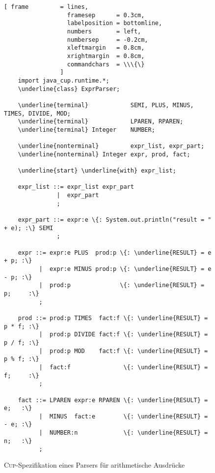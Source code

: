 \begin{figure}[!ht]
\centering
\begin{Verbatim}[ frame         = lines, 
                  framesep      = 0.3cm, 
                  labelposition = bottomline,
                  numbers       = left,
                  numbersep     = -0.2cm,
                  xleftmargin   = 0.8cm,
                  xrightmargin  = 0.8cm,
                  commandchars  = \\\{\}
                ]
    import java_cup.runtime.*;
    \underline{class} ExprParser;
    
    \underline{terminal}            SEMI, PLUS, MINUS, TIMES, DIVIDE, MOD;
    \underline{terminal}            LPAREN, RPAREN;
    \underline{terminal} Integer    NUMBER;
    
    \underline{nonterminal}         expr_list, expr_part;
    \underline{nonterminal} Integer expr, prod, fact;
    
    \underline{start} \underline{with} expr_list;

    expr_list ::= expr_list expr_part 
               |  expr_part
               ;
    
    expr_part ::= expr:e \{: System.out.println("result = " + e); :\} SEMI 
               ;
    
    expr ::= expr:e PLUS  prod:p \{: \underline{RESULT} = e + p; :\} 
          |  expr:e MINUS prod:p \{: \underline{RESULT} = e - p; :\} 
          |  prod:p              \{: \underline{RESULT} = p;     :\}
          ;
    
    prod ::= prod:p TIMES  fact:f \{: \underline{RESULT} = p * f; :\}
          |  prod:p DIVIDE fact:f \{: \underline{RESULT} = p / f; :\} 
          |  prod:p MOD    fact:f \{: \underline{RESULT} = p % f; :\} 
          |  fact:f               \{: \underline{RESULT} = f;     :\}
          ;
    
    fact ::= LPAREN expr:e RPAREN \{: \underline{RESULT} = e;   :\} 
          |  MINUS  fact:e        \{: \underline{RESULT} = - e; :\} 
          |  NUMBER:n             \{: \underline{RESULT} = n;   :\} 
          ;
\end{Verbatim}
\vspace*{-0.3cm}
\caption{\textsc{Cup}-Spezifikation eines Parsers f\"ur arithmetische Ausdr\"ucke}
\label{fig:calc.cup}
\end{figure}

